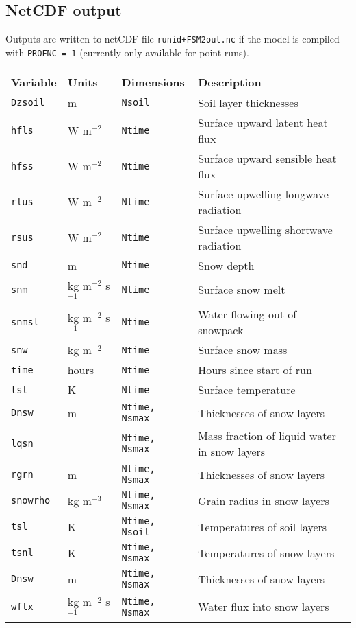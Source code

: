 \documentclass{article}
\begin{document}
\subsection{NetCDF output}

Outputs are written to netCDF file {\tt runid+FSM2out.nc} if the model is compiled with {\tt PROFNC = 1} (currently only available for point runs).

\begin{longtable}{|l|l|l|l|} \hline
Variable      & Units       & Dimensions          & Description                           \\ \hline
{\tt Dzsoil}  & m           & {\tt Nsoil}         & Soil layer thicknesses                \\
{\tt hfls}    & W m$^{-2}$  & {\tt Ntime}         & Surface upward latent heat flux       \\
{\tt hfss}    & W m$^{-2}$  & {\tt Ntime}         & Surface upward sensible heat flux     \\
{\tt rlus}    & W m$^{-2}$  & {\tt Ntime}         & Surface upwelling longwave radiation  \\
{\tt rsus}    & W m$^{-2}$  & {\tt Ntime}         & Surface upwelling shortwave radiation \\
{\tt snd}     & m           & {\tt Ntime}         & Snow depth                            \\
{\tt snm}     & kg m$^{-2}$ s$^{-1}$  & {\tt Ntime}  & Surface snow melt                  \\
{\tt snmsl}   & kg m$^{-2}$ s$^{-1}$  & {\tt Ntime}  & Water flowing out of snowpack      \\
{\tt snw}     & kg m$^{-2}$ & {\tt Ntime}         & Surface snow mass                     \\
{\tt time}    & hours       & {\tt Ntime}         & Hours since start of run              \\
{\tt tsl}     & K           & {\tt Ntime}         & Surface temperature                   \\
{\tt Dnsw}    & m           & {\tt Ntime, Nsmax}  & Thicknesses of snow layers            \\
{\tt lqsn}    &             & {\tt Ntime, Nsmax}  & Mass fraction of liquid water in snow layers  \\
{\tt rgrn}    & m           & {\tt Ntime, Nsmax}  & Thicknesses of snow layers            \\
{\tt snowrho} & kg m$^{-3}$ & {\tt Ntime, Nsmax}  & Grain radius in snow layers           \\
{\tt tsl}     & K           & {\tt Ntime, Nsoil}  & Temperatures of soil layers           \\
{\tt tsnl}    & K           & {\tt Ntime, Nsmax}  & Temperatures of snow layers           \\
{\tt Dnsw}    & m           & {\tt Ntime, Nsmax}  & Thicknesses of snow layers            \\
{\tt wflx}    & kg m$^{-2}$ s$^{-1}$  & {\tt Ntime, Nsmax}  & Water flux into snow layers \\
\hline 
\end{longtable}
\end{document}
